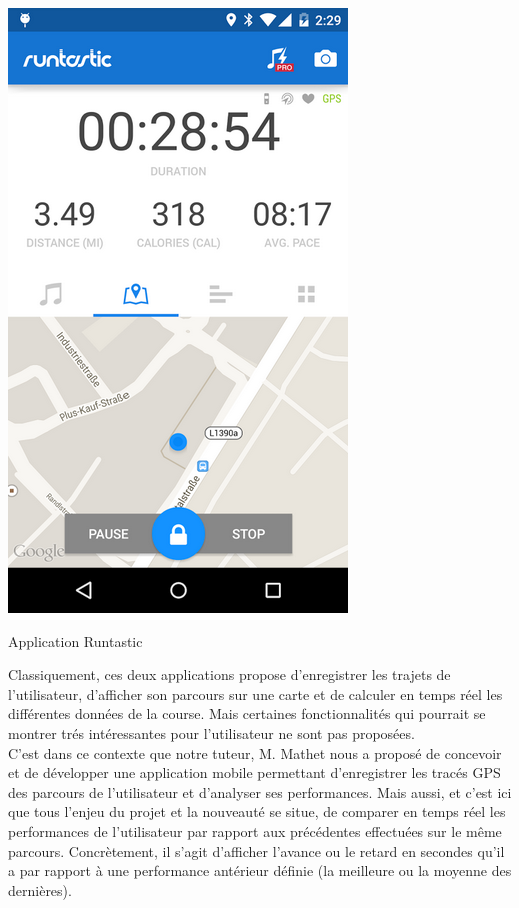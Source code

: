 \begin{multicols}{2}
\begin{img}
  \includegraphics{img/Runtastic.png}
  \caption{Application Runtastic}
\end{img}
\end{multicols}

Classiquement, ces deux applications propose d'enregistrer les trajets de l'utilisateur, d'afficher son parcours sur une carte et de calculer en temps réel les différentes données de la course. Mais certaines fonctionnalités qui pourrait se montrer trés intéressantes pour l'utilisateur ne sont pas proposées.\\
 
C'est dans ce contexte que notre tuteur, M. Mathet nous a proposé de concevoir et de développer une application mobile permettant d'enregistrer les tracés GPS des parcours de l'utilisateur et d'analyser ses performances. Mais aussi, et c'est ici que tous l'enjeu du projet et la nouveauté se situe, de comparer en temps réel les performances de l'utilisateur par rapport aux  précédentes effectuées sur le même parcours. Concrètement, il s'agit d'afficher l'avance ou le retard en secondes qu'il a par rapport à une performance antérieur définie (la meilleure ou la moyenne des dernières). 

